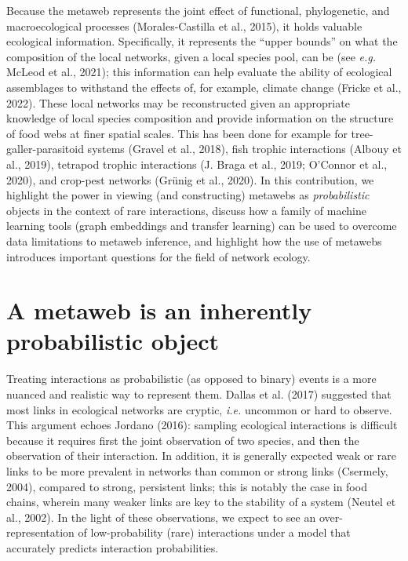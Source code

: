 \documentclass[10pt,oneside]{article}
\begin{document}
Because the metaweb represents the joint effect of functional,
phylogenetic, and macroecological processes (Morales-Castilla et al.,
2015), it holds valuable ecological information. Specifically, it
represents the ``upper bounds'' on what the composition of the local
networks, given a local species pool, can be (see \emph{e.g.} McLeod et
al., 2021); this information can help evaluate the ability of ecological
assemblages to withstand the effects of, for example, climate change
(Fricke et al., 2022). These local networks may be reconstructed given
an appropriate knowledge of local species composition and provide
information on the structure of food webs at finer spatial scales. This
has been done for example for tree-galler-parasitoid systems (Gravel et
al., 2018), fish trophic interactions (Albouy et al., 2019), tetrapod
trophic interactions (J. Braga et al., 2019; O'Connor et al., 2020), and
crop-pest networks (Grünig et al., 2020). In this contribution, we
highlight the power in viewing (and constructing) metawebs as
\emph{probabilistic} objects in the context of rare interactions,
discuss how a family of machine learning tools (graph embeddings and
transfer learning) can be used to overcome data limitations to metaweb
inference, and highlight how the use of metawebs introduces important
questions for the field of network ecology.

\hypertarget{a-metaweb-is-an-inherently-probabilistic-object}{%
\section{A metaweb is an inherently probabilistic
object}\label{a-metaweb-is-an-inherently-probabilistic-object}}

Treating interactions as probabilistic (as opposed to binary) events is
a more nuanced and realistic way to represent them. Dallas et al. (2017)
suggested that most links in ecological networks are cryptic,
\emph{i.e.} uncommon or hard to observe. This argument echoes Jordano
(2016): sampling ecological interactions is difficult because it
requires first the joint observation of two species, and then the
observation of their interaction. In addition, it is generally expected
weak or rare links to be more prevalent in networks than common or
strong links (Csermely, 2004), compared to strong, persistent links;
this is notably the case in food chains, wherein many weaker links are
key to the stability of a system (Neutel et al., 2002). In the light of
these observations, we expect to see an over-representation of
low-probability (rare) interactions under a model that accurately
predicts interaction probabilities.
\end{document}
